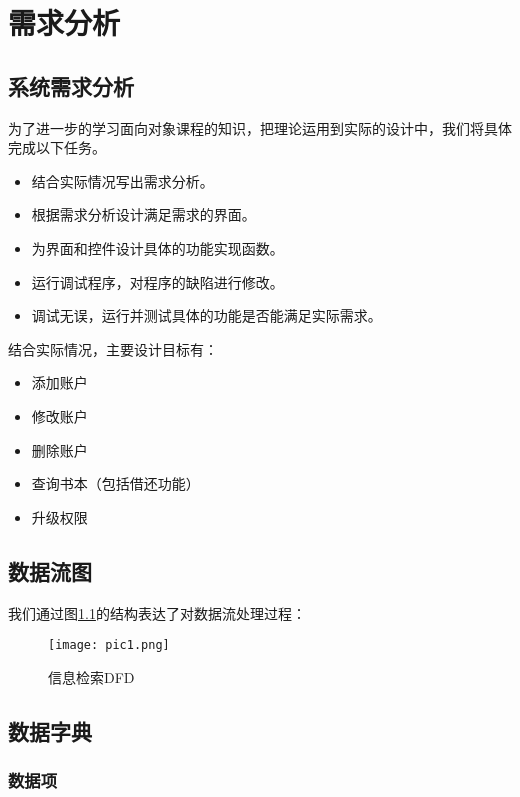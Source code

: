 \documentclass[forprint]{shmtu}
\begin{document}
\chapter{需求分析}

\section{系统需求分析}

为了进一步的学习面向对象课程的知识，把理论运用到实际的设计中，我们将具体完成以下任务。

\begin{itemize}
	\item 结合实际情况写出需求分析。
	\item 根据需求分析设计满足需求的界面。
	\item 为界面和控件设计具体的功能实现函数。
	\item 运行调试程序，对程序的缺陷进行修改。
	\item 调试无误，运行并测试具体的功能是否能满足实际需求。
\end{itemize}

结合实际情况，主要设计目标有：

\begin{itemize}
	\item 添加账户
	\item 修改账户
	\item 删除账户
	\item 查询书本（包括借还功能）
	\item 升级权限
\end{itemize}

\section{数据流图}

我们通过图\ref{pic:1}的结构表达了对数据流处理过程：

\begin{figure}[!htbp]
	\centering
	\texttt{[image: pic1.png]}
	\caption{信息检索DFD}
	\label{pic:1}
\end{figure}

\section{数据字典}

\subsection{数据项}
\end{document}
